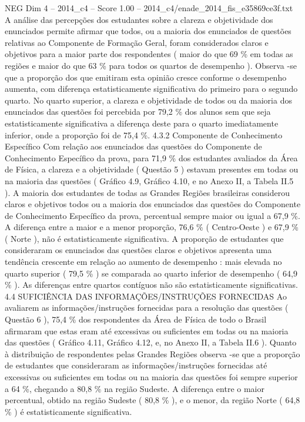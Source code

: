 \begin{textsample}{NEG Dim 4 – 2014\_c4 – Score 1.00 – 2014\_c4/enade\_2014\_fis\_e35869ce3f.txt}
A análise das percepções dos estudantes sobre a clareza e objetividade dos enunciados permite afirmar que todos, ou a maioria dos enunciados de questões relativas ao Componente de Formação Geral, foram considerados claros e objetivos para a maior parte dos respondentes ( maior do que 69 \% em todas as regiões e maior do que 63 \% para todos os quartos de desempenho ).
Observa -se que a proporção dos que emitiram esta opinião cresce conforme o desempenho aumenta, com diferença estatisticamente significativa do primeiro para o segundo quarto.
No quarto superior, a clareza e objetividade de todos ou da maioria dos enunciados das questões foi percebida por 79,2 \% dos alunos sem que seja estatisticamente significativa a diferença deste para o quarto imediatamente inferior, onde a proporção foi de 75,4 \%. 4.3.2 Componente de Conhecimento Específico Com relação aos enunciados das questões do Componente de Conhecimento Específico da prova, para 71,9 \% dos estudantes avaliados da Área de Física, a clareza e a objetividade ( Questão 5 ) estavam presentes em todas ou na maioria das questões ( Gráfico 4.9, Gráfico 4.10, e no Anexo II, a Tabela II.5 ).
A maioria dos estudantes de todas as Grandes Regiões brasileiras considerou claros e objetivos todos ou a maioria dos enunciados das questões do Componente de Conhecimento Específico da prova, percentual sempre maior ou igual a 67,9 \%.
A diferença entre a maior e a menor proporção, 76,6 \% ( Centro-Oeste ) e 67,9 \% ( Norte ), não é estatisticamente significativa.
A proporção de estudantes que consideraram os enunciados das questões claros e objetivos apresenta uma tendência crescente em relação ao aumento de desempenho : mais elevada no quarto superior ( 79,5 \% ) se comparada ao quarto inferior de desempenho ( 64,9 \% ).
As diferenças entre quartos contíguos não são estatisticamente significativas. 4.4 SUFICIÊNCIA DAS INFORMAÇÕES/INSTRUÇÕES FORNECIDAS Ao avaliarem as informações/instruções fornecidas para a resolução das questões ( Questão 6 ), 75,4 \% dos respondentes da Área de Física de todo o Brasil afirmaram que estas eram até excessivas ou suficientes em todas ou na maioria das questões ( Gráfico 4.11, Gráfico 4.12, e, no Anexo II, a Tabela II.6 ).
Quanto à distribuição de respondentes pelas Grandes Regiões observa -se que a proporção de estudantes que consideraram as informações/instruções fornecidas até excessivas ou suficientes em todas ou na maioria das questões foi sempre superior a 64 \%, chegando a 80,8 \% na região Sudeste.
A diferença entre o maior percentual, obtido na região Sudeste ( 80,8 \% ), e o menor, da região Norte ( 64,8 \% ) é estatisticamente significativa.

\end{textsample}
